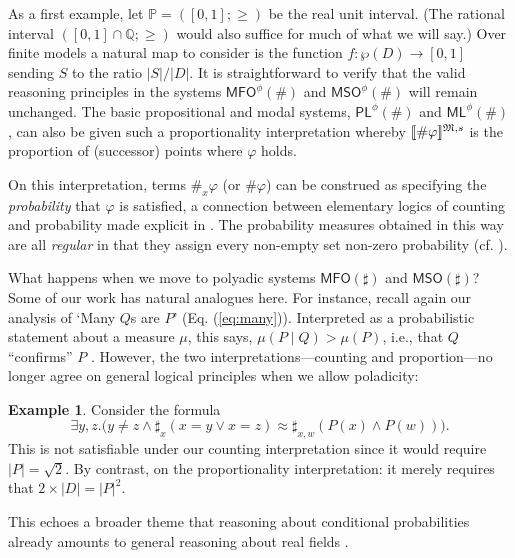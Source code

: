 \documentclass[12pt,oneside,reqno]{amsart}
\newcommand{\semantics}[1]{[\![\mbox{\em $ #1 $\/}]\!]}
\theoremstyle{definition}
\newtheorem{example}{Example}
\begin{document}
As a first example, let $\mathbb{P} = ([0,1];\geq)$ be the real unit interval. (The rational interval $([0,1]\cap\mathbb{Q};\geq)$ would also suffice for much of what we will say.) Over finite models a  natural map to consider is the function $f:\wp{(D)} \rightarrow [0,1]$ sending $S$ to the ratio $|S|/|D|$. It is straightforward to verify that the valid reasoning principles in  the systems $\mathsf{MFO}^\phi(\#)$ and $\mathsf{MSO}^\phi(\#)$ will remain unchanged. The basic propositional and modal systems, $\mathsf{PL}^\phi(\#)$ and $\mathsf{ML}^{\phi}(\#)$, can also be given such a proportionality interpretation whereby $\semantics{\#\varphi}^{\mathfrak{M},s}$ is the proportion of (successor) points where $\varphi$ holds. 

On this interpretation, terms $\#_x\varphi$ (or $\#\varphi$) can be construed as specifying the \emph{probability} that $\varphi$ is satisfied, a connection between elementary logics of counting and  probability made explicit in \cite{Hoek1996b}. The probability measures obtained in this way are all \emph{regular} in that they assign every non-empty set non-zero probability (cf. \citealt{Ding2021}). 

What happens when we move to polyadic systems $\mathsf{MFO}(\sharp)$ and $\mathsf{MSO}(\sharp)$? Some of our work has natural analogues here. For instance, recall again our analysis of `Many $Q$s are $P$' (Eq. (\ref{eq:many})). Interpreted as a probabilistic statement about a measure $\mu$, this says, $\mu(P\mid Q) > \mu(P)$, i.e., that $Q$ ``confirms'' $P$ \citep{reichenbach:56}. However, the two interpretations---counting and proportion---no longer agree on general logical principles when we allow poladicity:
\begin{example} \label{example:probprop} Consider the formula
$$\exists y,z.\big(y \neq z \wedge \sharp_x(x= y \vee x = z) \approx \sharp_{x,w}(P(x) \wedge P(w))\big).$$ This is not satisfiable under our counting interpretation since it would require $|P| = \sqrt{2}$. By contrast, on the proportionality interpretation: it merely requires that $2 \times |D| = |P|^2$. \end{example}
This echoes a broader theme that reasoning about conditional probabilities already amounts to general reasoning about real fields \citep{Mosse,Ibeling}.
\end{document}
